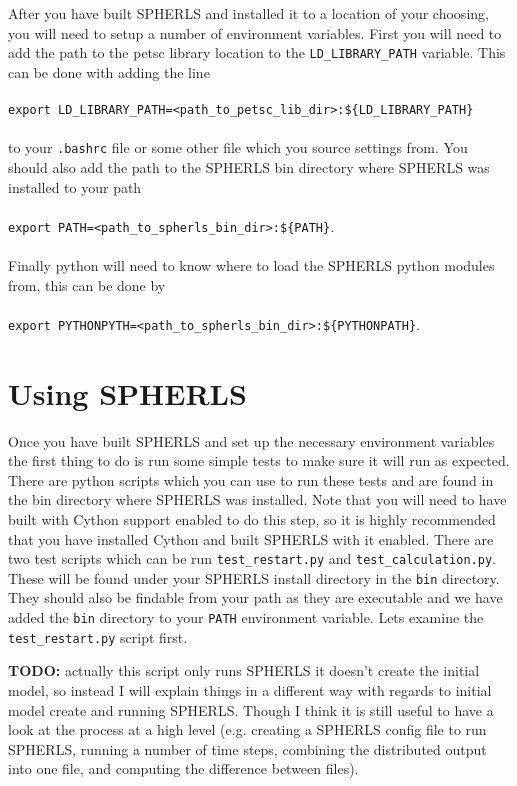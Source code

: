 \documentclass[12pt,a4paper]{book}
\begin{document}
After you have built SPHERLS and installed it to a location of your choosing, you will need to setup a number of environment variables. First you will need to add the path to the petsc library location to the {\tt LD\_LIBRARY\_PATH} variable. This can be done with adding the line\\
 \\
{\tt export LD\_LIBRARY\_PATH=<path\_to\_petsc\_lib\_dir>:\$\{LD\_LIBRARY\_PATH\}}\\
 \\
to your {\tt .bashrc} file or some other file which you source settings from. You should also add the path to the SPHERLS bin directory where SPHERLS was installed to your path \\
 \\
{\tt export PATH=<path\_to\_spherls\_bin\_dir>:\$\{PATH\}}.\\
 \\
Finally python will need to know where to load the SPHERLS python modules from, this can be done by \\
 \\
{\tt export PYTHONPYTH=<path\_to\_spherls\_bin\_dir>:\$\{PYTHONPATH\}}.

\chapter{Using SPHERLS}
Once you have built SPHERLS and set up the necessary environment variables the first thing to do is run some simple tests to make sure it will run as expected. There are python scripts which you can use to run these tests and are found in the bin directory where SPHERLS was installed. Note that you will need to have built with Cython support enabled to do this step, so it is highly recommended that you have installed Cython and built SPHERLS with it enabled. There are two test scripts which can be run {\tt test\_restart.py} and {\tt test\_calculation.py}. These will be found under your SPHERLS install directory in the {\tt bin} directory. They should also be findable from your path as they are executable and we have added the {\tt bin} directory to your {\tt PATH} environment variable. Lets examine the {\tt test\_restart.py} script first.

\textbf{TODO:} actually this script only runs SPHERLS it doesn't create the initial model, so instead I will explain things in a different way with regards to initial model create and running SPHERLS. Though I think it is still useful to have a look at the process at a high level (e.g. creating a SPHERLS config file to run SPHERLS, running a number of time steps, combining the distributed output into one file, and computing the difference between files).
\end{document}
